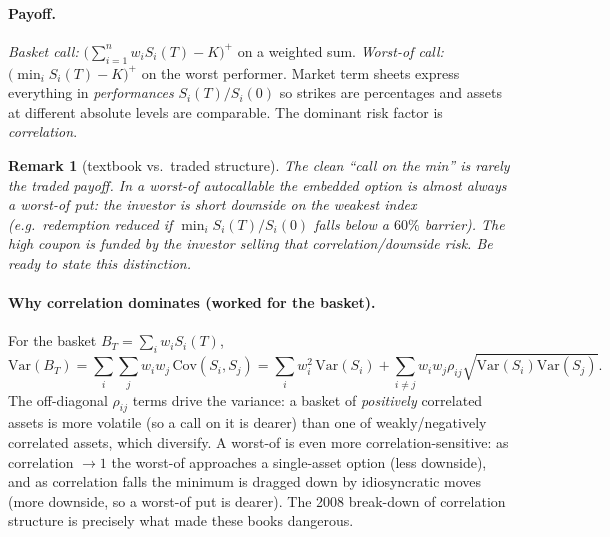 \documentclass[11pt]{article}
\newtheorem{remark}{Remark}
\begin{document}
\paragraph{Payoff.} \emph{Basket call:} $\big(\sum_{i=1}^n w_iS_i(T)-K\big)^+$ on a weighted sum.
\emph{Worst-of call:} $\big(\min_i S_i(T)-K\big)^+$ on the worst performer. Market term sheets express
everything in \emph{performances} $S_i(T)/S_i(0)$ so strikes are percentages and assets at different
absolute levels are comparable. The dominant risk factor is \emph{correlation}.

\begin{remark}[textbook vs.\ traded structure]
The clean ``call on the min'' is rarely the traded payoff. In a worst-of autocallable the embedded
option is almost always a worst-of \emph{put}: the investor is \emph{short} downside on the weakest
index (e.g.\ redemption reduced if $\min_i S_i(T)/S_i(0)$ falls below a $60\%$ barrier). The high
coupon is funded by the investor selling that correlation/downside risk. Be ready to state this
distinction.
\end{remark}

\paragraph{Why correlation dominates (worked for the basket).} For the basket $B_T=\sum_i w_iS_i(T)$,
\[
\mathrm{Var}(B_T)=\sum_{i}\sum_{j}w_iw_j\,\mathrm{Cov}(S_i,S_j)
=\sum_i w_i^2\,\mathrm{Var}(S_i)+\sum_{i\neq j}w_iw_j\rho_{ij}\sqrt{\mathrm{Var}(S_i)\mathrm{Var}(S_j)}.
\]
The off-diagonal $\rho_{ij}$ terms drive the variance: a basket of \emph{positively} correlated
assets is more volatile (so a call on it is dearer) than one of weakly/negatively correlated assets,
which diversify. A worst-of is even more correlation-sensitive: as correlation $\to 1$ the worst-of
approaches a single-asset option (less downside), and as correlation falls the minimum is dragged
down by idiosyncratic moves (more downside, so a worst-of put is dearer). The 2008 break-down of
correlation structure is precisely what made these books dangerous.
\end{document}
